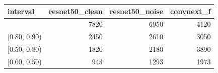 \begin{tabular}{lrrr}
\toprule
interval & resnet50_clean & resnet50_noise & convnext_f \\
\midrule
[0.90, 1.00] & 7820 & 6950 & 4120 \\
[0.80, 0.90) & 2450 & 2610 & 3050 \\
[0.50, 0.80) & 1820 & 2180 & 3890 \\
[0.00, 0.50) & 943 & 1293 & 1973 \\
\bottomrule
\end{tabular}
